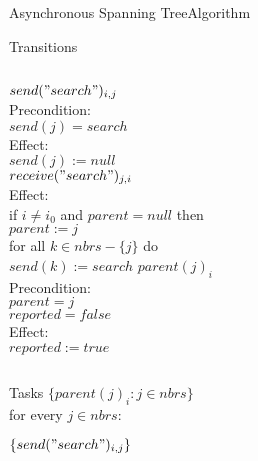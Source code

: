 \documentclass[pdf]{beamer}
\begin{document}
\begin{frame}{Asynchronous Spanning Tree}{Algorithm}
    \begin{block}{Transitions}
        \begin{columns}[t]
            $send("search")_{i,j}$ \\
            \hspace*{2pt} {Precondition:} \\
            \hspace*{5pt} {$send(j) = search$} \\
            \hspace*{2pt} {Effect:} \\
            \hspace*{5pt} {$send(j) := null$} \\
            \vspace{12pt}
            $receive("search")_{j,i}$ \\
            \hspace*{2pt} {Effect:} \\
            \hspace*{5pt} {if $i \neq i_0$ and $parent = null$ then}\\
            \hspace*{7pt} {$parent := j$} \\
            \hspace*{7pt} {for all $k \in nbrs - \{j\}$ do} \\
            \hspace*{9pt} {$send(k) := search$} 
            $parent(j)_{i}$ \\
            \hspace*{2pt} {Precondition:} \\
            \hspace*{5pt} {$parent = j$} \\
            \hspace*{5pt} {$reported = false$} \\
            \hspace*{2pt} {Effect:} \\
            \hspace*{5pt} {$reported := true$} 
        \end{columns}
    \end{block}
    \vskip-3cm
    \begin{columns}
    \begin{block}{Tasks}
    $\{parent(j)_i : j \in nbrs\}$\\
    for every $j \in nbrs$: \\
        \hspace*{2pt}
        \parbox{\textwidth}{$\{send("search")_{i,j}\}$}
    \end{block}
    \end{columns}
\end{frame}
\end{document}
